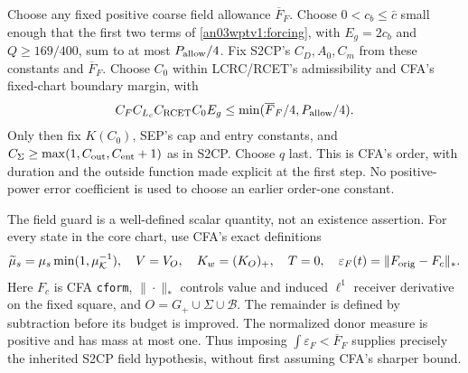 \documentclass[11pt]{article}
\theoremstyle{remark}\newtheorem{remark}[theorem]{Remark}
\newcommand{\KK}{\mathcal K}
\newcommand{\BB}{\mathcal B}
\newcommand{\Gp}{G_+}
\newcommand{\eps}{\varepsilon}
\begin{document}
Choose any fixed positive coarse field allowance $\overline F_F$.
Choose $0<c_b\le\bar c$ small enough that the first two terms
of \eqref{an03wptv1:forcing}, with $E_g=2c_b$ and $Q\ge169/400$,
sum to at most $P_{\rm allow}/4$. Fix S2CP's $C_D,A_0,C_m$
from these constants and $\overline F_F$. Choose $C_0$ within
LCRC/RCET's admissibility and CFA's fixed-chart boundary margin,
with
\begin{equation}
 C_FC_{L_c}C_{\rm RCET}C_0E_g
 \le\min(\overline F_F/4,P_{\rm allow}/4).
 \label{an03wptv1:C0choice}
\end{equation}
Only then fix $K(C_0)$, SEP's cap and entry constants, and
$C_\Sigma\ge\max(1,C_{\rm out},C_{\rm ent}+1)$ as in S2CP.
Choose $q$ last. This is CFA's order, with duration and the outside
function made explicit at the first step. No positive-power error
coefficient is used to choose an earlier order-one constant.

The field guard is a well-defined scalar quantity, not an existence
assertion. For every state in the core chart, use CFA's exact
definitions
\[
 \widetilde\mu_s=\mu_s\min(1,\mu_{\KK}^{-1}),\quad
 V=V_O,\quad K_w=(K_O)_+,\quad T=0,
 \quad\eps_F(t)=\|F_{\rm orig}-F_c\|_*.
\]
Here $F_c$ is CFA \texttt{cform}, $\|\cdot\|_*$ controls value and
induced $\ell^1$ receiver derivative on the fixed square, and
$O=\Gp\cup\Sigma\cup\BB$. The remainder is defined by subtraction
before its budget is improved. The normalized donor measure is
positive and has mass at most one. Thus imposing
$\int\eps_F<\overline F_F$ supplies precisely the inherited
S2CP field hypothesis, without first assuming CFA's sharper bound.
\end{document}

